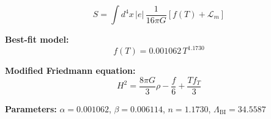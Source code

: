 
\begin{equation}
  S = \int d^4x \, |e| \, \frac{1}{16\pi G} \left[ f(T) + \mathcal{L}_m \right]
\end{equation}

\textbf{Best-fit model:}
\begin{equation}
  f(T) = 0.001062 \, T^{1.1730}
\end{equation}

\textbf{Modified Friedmann equation:}
\begin{equation}
  H^2 = \frac{8\pi G}{3} \rho - \frac{f}{6} + \frac{T f_T}{3}
\end{equation}

\textbf{Parameters:}
$\alpha = 0.001062$, \quad
$\beta = 0.006114$, \quad
$n = 1.1730$, \quad
$\Lambda_{\text{BI}} = 34.5587$
